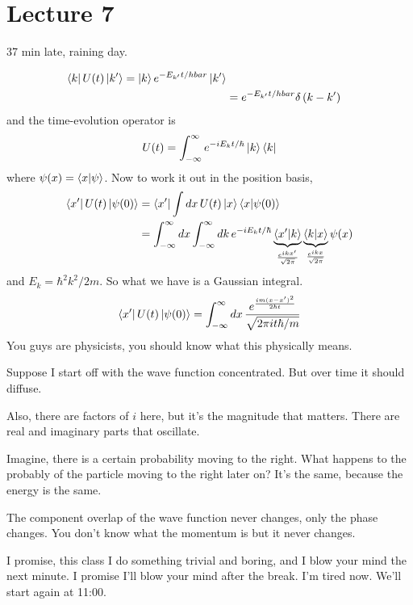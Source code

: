 \section{Lecture 7}
37 min late, raining day.

\begin{align}
    \bra{k} U(t) \ket{k'} =  \ket{k} e^{-E_{k'}t/hbar}\ket{k'}\\
    &= e^{-E_{k'}t/hbar}\delta\left(k - k' \right)
\end{align}
and the time-evolution operator is
\begin{align}
    U(t) = \int_{-\infty}^{\infty} e^{-iE_k t/\hbar}\ket{k}\bra{k}
\end{align}
where $\psi(x) = \braket{x}{\psi}$.
Now to work it out in the position basis,
\begin{align}
    \bra{x'}U(t)\ket{\psi(0)}
    &= \bra{x'}
    \int dx\, U(t)
    \ket{x}\braket{x}{\psi(0)}\\
    &= \int_{-\infty}^{\infty}dx
    \int_{-\infty}^{\infty}dk\,
    e^{-iE_k t/\hbar}
    \underbrace{\braket{x'}{k}}_{\frac{e^{ikx'}}{\sqrt{2\pi}}}
    \underbrace{\braket{k}{x}}_{\frac{e^{ikx}}{\sqrt{2\pi}}}
    \psi(x)
\end{align}
and $E_k = \hbar^2 k^2/2m$.
So what we have is a Gaussian integral.
\begin{align}
    \bra{x'}U(t)\ket{\psi(0)}
    = \int_{-\infty}^{\infty} dx\,
    \frac{e^{\frac{i m(x - x')^2}{2\hbar t}}}{\sqrt{2\pi i t\hbar/m}}
\end{align}
You guys are physicists,
you should know what this physically means.

Suppose I start off with the wave function concentrated.
But over time it should diffuse.

Also, there are factors of $i$ here,
but it's the magnitude that matters.
There are real and imaginary parts that oscillate.

Imagine,
there is a certain probability moving to the right.
What happens to the probably of the particle moving to the right later on?
It's the same,
because the energy is the same.

The component overlap of the wave function never changes,
only the phase changes.
You don't know what the momentum is but it never changes.

I promise,
this class I do something trivial and boring,
and I blow your mind the next minute.
I promise I'll blow your mind after the break.
I'm tired now.
We'll start again at 11:00.


